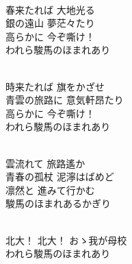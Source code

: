 \documentclass[10pt,b5j]{tarticle} %
\begin{document}
\vspace{1.5em} %
\newcommand{\linespace}{0.5em} %
\newcommand{\blocksize}{0.5\hsize} %
\newcommand{\itemmargin}{3em} %
\begin{enumerate} %
    \setlength{\itemindent}{\itemmargin} %
    \begin{minipage}[c]{\blocksize}
    
        \vspace{\linespace}
        \item~\\
        春来たれば 大地光る\\
        銀の遠山 夢茫々たり\\
        高らかに 今ぞ嘶け！\\
        われら駿馬のほまれあり
        
    \end{minipage}
    \begin{minipage}[c]{\blocksize}
        
        \vspace{\linespace}
        \item~\\
        時来たれば 旗をかざせ\\
        青雲の旅路に 意気軒昂たり\\
        高らかに 今ぞ嘶け！\\
        われら駿馬のほまれあり
        
    \end{minipage}
    \begin{minipage}[c]{\blocksize}
        
        \vspace{\linespace}
        \item~\\
        雲流れて 旅路遙か\\
        青春の孤杖 泥濘はばめど\\
        凛然と 進みて行かむ\\
        駿馬のほまれあるかぎり
        
    \end{minipage}
    \begin{minipage}[c]{\blocksize}
        
        \vspace{\linespace}
        \item~\\
        北大！ 北大！ おゝ我が母校\\
        われら駿馬のほまれあり
    
    \end{minipage}
\end{enumerate} %
\end{document}
